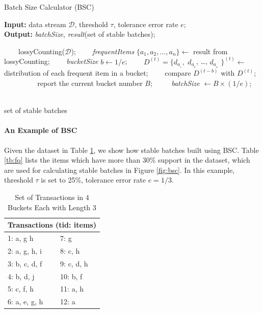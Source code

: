 \begin{algorithm}[h!]
\caption{Batch Size Calculator (BSC)} 
\label{alg:bsc}
\hspace*{0.02in} {\bf Input:} 
data stream $\mathcal{D}$, threshold $\tau$, tolerance error rate $e$;\\
\hspace*{0.02in} {\bf Output:} 
\textit{batchSize}, \textit{result}(set of stable batches);
\begin{algorithmic}[1]

　　\State lossyCounting($\mathcal{D}$);
　　\State \textit{frequentItems} $\{a_1,a_2,...,a_n\}\leftarrow$ result from lossyCounting;
　　\State \textit{bucketSize} $b\leftarrow1/e$;
　　\State $D^{(t)} = \{d_a__1,$ $d_a__2$, \ldots, $d_a__n$ $\}^{(t)}\leftarrow$ distribution of each frequent item in a bucket;
　　\State compare $D^{(t-b)}$ with $D^{(t)}$;
　　    \State report the current bucket number $B$;
　　    \State \textit{batchSize} $\leftarrow B \times (1/e)$;
　　\EndIf
\EndWhile

\State \Return set of stable batches
\end{algorithmic}
\end{algorithm}

\paragraph{An Example of BSC}

Given the dataset in Table \ref{tb:tid}, we show how stable batches  built using BSC. Table \ref{tb:fq} lists the items which have more than 30\% support in the dataset, which are used for calculating stable batches in Figure \ref{fig:bsc}. In this example, threshold $\tau$ is set to 25\%, tolerance error rate $e = 1/3$.

\begin{table}[h!]
\caption{Set of Transactions in 4 Buckets Each with Length 3}
\label{tb:tid}
\centering
 \begin{tabular}{p{4cm} p{4cm}} 
 \hline\hline
 \multicolumn{2}{c}{Transactions (tid: items)}\\
 \hline
 1: a, g h & 7: g \\ 
 2: a, g, h, i & 8: c, h \\
 3: b, c, d, f & 9: c, d, h \\
 4: b, d, j & 10: b, f \\
 5: c, f, h & 11: a, h  \\
 6: a, e, g, h & 12: a \\
 \hline
\end{tabular}
\end{table}

